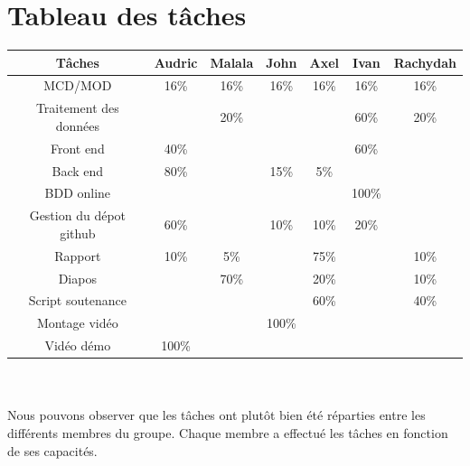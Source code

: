 \documentclass[12pt,a4paper]{report}
\begin{document}
\section{Tableau des tâches}
\vspace{0.4cm}
\begin{tabular}{|c|c|c|c|c|c|c|}
\hline
Tâches & Audric & Malala & John & Axel & Ivan & Rachydah \\
\hline
MCD/MOD & 16\% & 16\% & 16\% & 16\% & 16\% & 16\%\\
\hline
Traitement des données & & 20\% & & & 60\% & 20\%\\
\hline
Front end & 40\% & & & & 60\% & \\
\hline
Back end & 80\% & & 15\% & 5\% & &\\
\hline
BDD online & & & & & 100\% & \\
\hline
Gestion du dépot github & 60\% & & 10\% & 10\% & 20\% & \\
\hline
Rapport & 10\% & 5\% & & 75\% & & 10\% \\
\hline
Diapos & & 70\% & & 20\% & & 10\% \\
\hline
Script soutenance & & & & 60\% & & 40\% \\
\hline
Montage vidéo & & & 100\% & & & \\
\hline
Vidéo démo & 100\% & & & & & \\
\hline
\end{tabular} \\ \\

Nous pouvons observer que les tâches ont plutôt bien été réparties entre les différents membres du groupe. Chaque membre a effectué les tâches en fonction de ses capacités.
\end{document}
